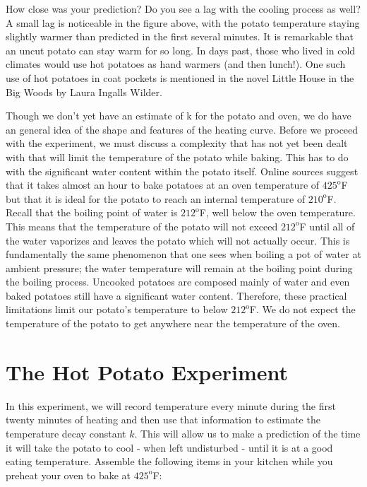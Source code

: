 \documentclass{ximera}
\begin{document}
How close was your prediction?  Do you see a lag with the cooling process as well?  A small lag is noticeable in the figure above, with the potato temperature staying slightly warmer than predicted in the first several minutes.  It is remarkable that an uncut potato can stay warm for so long.  In days past, those who lived in cold climates would use hot potatoes as hand warmers (and then lunch!).  One such use of hot potatoes in coat pockets is mentioned in the novel Little House in the Big Woods by Laura Ingalls Wilder.





Though we don’t yet have an estimate of k for the potato and oven, we do have an general idea of the shape and features of the heating curve.  Before we proceed with the experiment, we must discuss a complexity that has not yet been dealt with that will limit the temperature of the potato while baking.  This has to do with the significant water content within the potato itself.  Online sources suggest that it takes almost an hour to bake potatoes at an oven temperature of $425^{\text{o}}$F but that it is ideal for the potato to reach an internal temperature of $210^{\text{o}}$F.  Recall that the boiling point of water is $212^{\text{o}}$F, well below the oven temperature.  This means that the temperature of the potato will not exceed $212^{\text{o}}$F until all of the water vaporizes and leaves the potato which will not actually occur.  This is fundamentally the same phenomenon that one sees when boiling a pot of water at ambient pressure; the water temperature will remain at the boiling point during the boiling process.  Uncooked potatoes are composed mainly of water and even baked potatoes still have a significant water content.  Therefore, these practical limitations limit our potato’s temperature to below $212^{\text{o}}$F.  We do not expect the temperature of the potato to get anywhere near the temperature of the oven.
  
\section*{The Hot Potato Experiment}
In this experiment, we will record temperature every minute during the first twenty minutes of heating and then use that information to estimate the temperature decay constant $k$.  This will allow us to make a prediction of the time it will take the potato to cool - when left undisturbed - until it is at a good eating temperature.
Assemble the following items in your kitchen while you preheat your oven to bake at $425^{\text{o}}$F:
 
\end{document}
